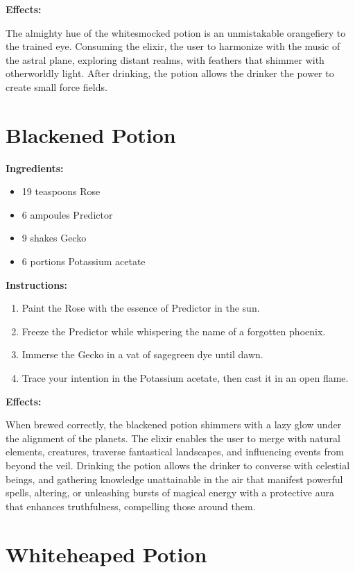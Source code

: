 \documentclass{article}
\begin{document}
\textbf{Effects:}

The almighty hue of the whitesmocked potion is an unmistakable orangefiery to the trained eye. Consuming the elixir, the user to harmonize with the music of the astral plane, exploring distant realms, with feathers that shimmer with otherworldly light. After drinking, the potion allows the drinker the power to create small force fields.

\newpage
\section*{Blackened Potion}

\textbf{Ingredients:}

\begin{itemize}
  \item 19 teaspoons Rose
  \item 6 ampoules Predictor
  \item 9 shakes Gecko
  \item 6 portions Potassium acetate
\end{itemize}

\textbf{Instructions:}

\begin{enumerate}
  \item Paint the Rose with the essence of Predictor in the sun.
  \item Freeze the Predictor while whispering the name of a forgotten phoenix.
  \item Immerse the Gecko in a vat of sagegreen dye until dawn.
  \item Trace your intention in the Potassium acetate, then cast it in an open flame.
\end{enumerate}

\textbf{Effects:}

When brewed correctly, the blackened potion shimmers with a lazy glow under the alignment of the planets. The elixir enables the user to merge with natural elements, creatures, traverse fantastical landscapes, and influencing events from beyond the veil. Drinking the potion allows the drinker to converse with celestial beings, and gathering knowledge unattainable in the air that manifest powerful spells, altering, or unleashing bursts of magical energy with a protective aura that enhances truthfulness, compelling those around them.

\newpage
\section*{Whiteheaped Potion}
\end{document}
